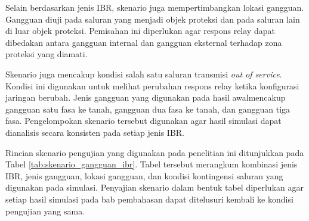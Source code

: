 Selain berdasarkan jenis IBR, skenario juga mempertimbangkan lokasi gangguan. Gangguan diuji pada saluran yang menjadi objek proteksi dan pada saluran lain di luar objek proteksi. Pemisahan ini diperlukan agar respons relay dapat dibedakan antara gangguan internal dan gangguan eksternal terhadap zona proteksi yang diamati.

Skenario juga mencakup kondisi salah satu saluran transmisi \textit{out of service}. Kondisi ini digunakan untuk melihat perubahan respons relay ketika konfigurasi jaringan berubah. Jenis gangguan yang digunakan pada hasil awalmencakup gangguan satu fasa ke tanah, gangguan dua fasa ke tanah, dan gangguan tiga fasa. Pengelompokan skenario tersebut digunakan agar hasil simulasi dapat dianalisis secara konsisten pada setiap jenis IBR.

Rincian skenario pengujian yang digunakan pada penelitian ini ditunjukkan pada Tabel \ref{tab:skenario_gangguan_ibr}. Tabel tersebut merangkum kombinasi jenis IBR, jenis gangguan, lokasi gangguan, dan kondisi kontingensi saluran yang digunakan pada simulasi. Penyajian skenario dalam bentuk tabel diperlukan agar setiap hasil simulasi pada bab pembahasan dapat ditelusuri kembali ke kondisi pengujian yang sama.

\begin{table}[H]
    \centering
    \caption{Skenario Gangguan pada Sistem dengan Integrasi IBR}
    \label{tab:skenario_gangguan_ibr}
\end{table}

